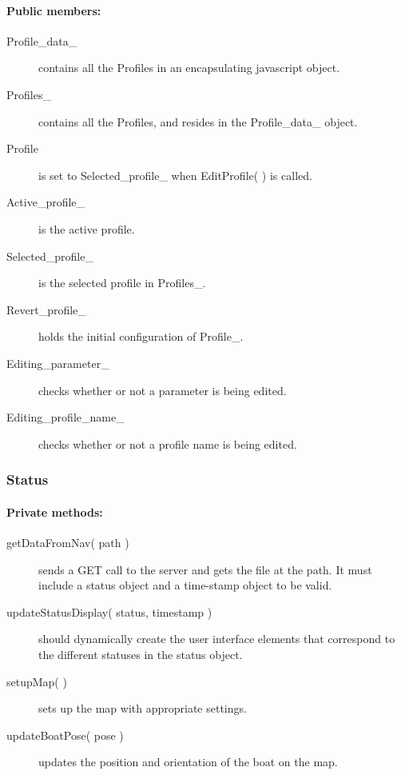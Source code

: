 \paragraph{Public members:}
\begin{adjustwidth}{2.5em}{0pt}\begin{description}
	\item [Profile_data_] contains all the Profiles in an encapsulating javascript object.
	\item [Profiles_] contains all the Profiles, and resides in the Profile_data_ object.
	\item [Profile] is set to Selected_profile_ when EditProfile( ) is called.
	\item [Active_profile_] is the active profile.
	\item [Selected_profile_] is the selected profile in Profiles_.
	\item [Revert_profile_] holds the initial configuration of Profile_.
	\item [Editing_parameter_] checks whether or not a parameter is being edited.
	\item [Editing_profile_name_] checks whether or not a profile name is being edited.
\end{description}\end{adjustwidth}

\subsubsection{Status}


\paragraph{Private methods:}
\begin{adjustwidth}{2.5em}{0pt}\begin{description}
		\item [getDataFromNav( path )] sends a GET call to the server and gets the file at the path. It must include a status object and a time-stamp object to be valid.
		\item [updateStatusDisplay( status, timestamp )] should dynamically create the user interface elements that correspond to the different statuses in the status object. 
		\item [setupMap( )] sets up the map with appropriate settings.
		\item [updateBoatPose( pose )] updates the position and orientation of the boat on the map.
\end{description}\end{adjustwidth}

